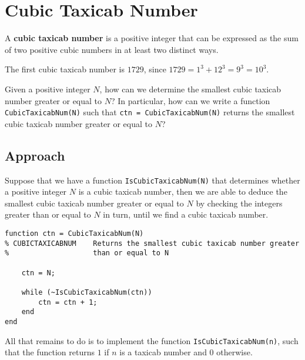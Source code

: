 \section{Cubic Taxicab Number}
\begin{definition}
	A \textbf{cubic taxicab number} is a positive integer that can be expressed as the sum of two positive cubic numbers in at least two distinct ways.
\end{definition}

\begin{example}
	The first cubic taxicab number is $1729$, since $1729 = 1^3 + 12^3 = 9^3 = 10^3$.
\end{example}

\begin{problem}
	Given a positive integer $N$, how can we determine the smallest cubic taxicab number greater or equal to $N$? In particular, how can we write a function \lstinline|CubicTaxicabNum(N)| such that \lstinline|ctn = CubicTaxicabNum(N)| returns the smallest cubic taxicab number greater or equal to $N$?
\end{problem}


\subsection{Approach}
Suppose that we have a function \lstinline|IsCubicTaxicabNum(N)| that determines whether a positive integer $N$ is a cubic taxicab number, then we are able to deduce the smallest cubic taxicab number greater or equal to $N$ by checking the integers greater than or equal to $N$ in turn, until we find a cubic taxicab number.\\

\begin{lstlisting}
function ctn = CubicTaxicabNum(N)
% CUBICTAXICABNUM    Returns the smallest cubic taxicab number greater
%                    than or equal to N

	ctn = N;

	while (~IsCubicTaxicabNum(ctn))
    	ctn = ctn + 1;
	end
end
\end{lstlisting}

\noindent
All that remains to do is to implement the function \lstinline|IsCubicTaxicabNum(n)|, such that the function returns $1$ if $n$ is a taxicab number and $0$ otherwise.

